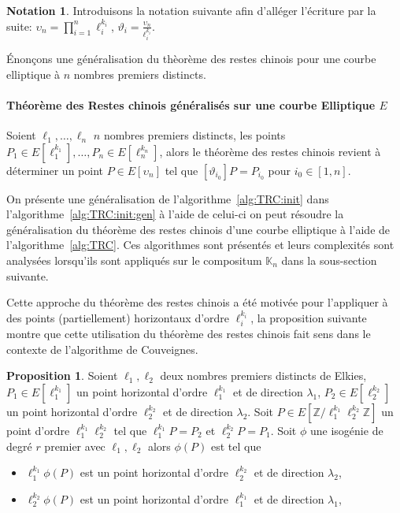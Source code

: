 \documentclass[10pt,a4paper]{book}
\theoremstyle{plain}
\theoremstyle{definition}
\theoremstyle{definition}
\theoremstyle{definition}
\newtheorem{prop}[thm]{Proposition}
\theoremstyle{definition}
\theoremstyle{remark}
\theoremstyle{remark}
\theoremstyle{definition}
\newtheorem{nota}[thm]{Notation}
\begin{document}
\begin{nota}
Introduisons la notation suivante afin d'alléger l'écriture par la suite: 
$\upsilon_n=\prod_{i=1}^n \ell_i^{k_i}$, 
$\vartheta_i=\frac{\upsilon_n}{\ell_i^{k_i}}$.
\end{nota}

\'Enonçons une généralisation du thèorème des restes chinois pour une courbe 
elliptique à $n$ nombres premiers distincts.

\paragraph{Théorème des Restes chinois généralisés sur une courbe Elliptique $E$}
Soient $\ell_1, \dots, \ell_n$ $n$ nombres premiers distincts, les points $P_1 \in E[\ell_1^{k_1}], \dots, P_n \in E[\ell_n^{k_n}]$, alors le théorème des restes chinois revient à déterminer un point $P \in E[\upsilon_n]$ tel que $[\vartheta_{i_0}] P=P_{i_0}$ pour $i_0 \in [1,n]$.

On présente une généralisation de l'algorithme~\ref{alg:TRC:init} dans 
l'algorithme~\ref{alg:TRC:init:gen} à l'aide de celui-ci on peut résoudre la 
généralisation du théorème des restes chinois d'une courbe elliptique à l'aide 
de l'algorithme~\ref{alg:TRC}. Ces algorithmes sont présentés et leurs 
complexités sont analysées lorsqu'ils sont appliqués sur le compositum 
$\mathbb{K}_n$ dans la sous-section suivante.


Cette approche du théorème des restes chinois a été motivée pour l'appliquer à 
des points (partiellement) horizontaux d'ordre $\ell_i^{k_i}$, la proposition 
suivante montre que cette utilisation du théorème des restes chinois fait sens 
dans le contexte de l'algorithme de Couveignes.

\begin{prop}
\label{pro:par:TRC}
Soient $\ell_1, \ell_2$ deux nombres premiers distincts de Elkies, 
$P_1 \in E[\ell_1^{k_1}]$ un point horizontal d'ordre 
$\ell_1^{k_1}$ et de direction $\lambda_1$, $P_2 \in E[\ell_2^{k_2}]$ un point 
horizontal d'ordre $\ell_2^{k_2}$ et de direction $\lambda_2$. Soit $P \in 
E[\mathbb{Z}/\ell_1^{k_1}\ell_2^{k_2}\mathbb{Z}]$ un point d'ordre 
$\ell_1^{k_1}\ell_2^{k_2}$ tel que $\ell_1^{k_1}P=P_2$ et $\ell_2^{k_2}P=P_1$.
Soit $\phi$ une isogénie de degré $r$ premier avec $\ell_1, \ell_2$ alors 
$\phi(P)$ est tel que
\begin{itemize}
\item $\ell_1^{k_1}\phi(P)$ est un point horizontal d'ordre 
$\ell_2^{k_2}$ et de direction $\lambda_2$,  
\item $\ell_2^{k_2}\phi(P)$ est un point horizontal d'ordre 
$\ell_1^{k_1}$ et de direction $\lambda_1$,
\end{itemize}
\end{prop}
\end{document}

